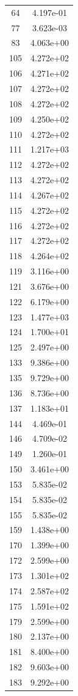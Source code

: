 \documentclass[12pt]{article}
\begin{document}
\begin{longtable}{@{}cc@{}}
64 & 4.197e-01 \\
77 & 3.623e-03 \\
83 & 4.063e+00 \\
105 & 4.272e+02 \\
106 & 4.271e+02 \\
107 & 4.272e+02 \\
108 & 4.272e+02 \\
109 & 4.250e+02 \\
110 & 4.272e+02 \\
111 & 1.217e+03 \\
112 & 4.272e+02 \\
113 & 4.272e+02 \\
114 & 4.267e+02 \\
115 & 4.272e+02 \\
116 & 4.272e+02 \\
117 & 4.272e+02 \\
118 & 4.264e+02 \\
119 & 3.116e+00 \\
121 & 3.676e+00 \\
122 & 6.179e+00 \\
123 & 1.477e+03 \\
124 & 1.700e+01 \\
125 & 2.497e+00 \\
133 & 9.386e+00 \\
135 & 9.729e+00 \\
136 & 8.736e+00 \\
137 & 1.183e+01 \\
144 & 4.469e-01 \\
146 & 4.709e-02 \\
149 & 1.260e-01 \\
150 & 3.461e+00 \\
153 & 5.835e-02 \\
154 & 5.835e-02 \\
155 & 5.835e-02 \\
159 & 1.438e+00 \\
170 & 1.399e+00 \\
172 & 2.599e+00 \\
173 & 1.301e+02 \\
174 & 2.587e+02 \\
175 & 1.591e+02 \\
179 & 2.599e+00 \\
180 & 2.137e+00 \\
181 & 8.400e+00 \\
182 & 9.603e+00 \\
183 & 9.292e+00 \\

\end{longtable}
\end{document}
